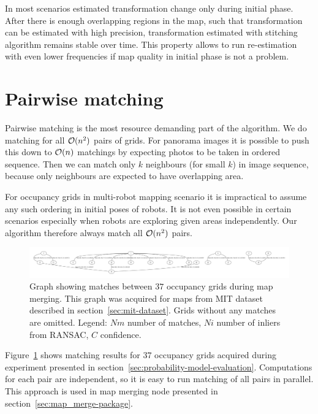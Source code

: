 In most scenarios estimated transformation change only during initial phase. After there is enough overlapping regions in the map, such that transformation can be estimated with high precision, transformation estimated with stitching algorithm remains stable over time. This property allows to run re-estimation with even lower frequencies if map quality in initial phase is not a problem.


\section{Pairwise matching} %
\label{sec:pairwisematching}

Pairwise matching is the most resource demanding part of the algorithm. We do matching for all $\operatorname{\mathcal{O}}(n^2)$ pairs of grids. For panorama images it is possible to push this down to $\operatorname{\mathcal{O}}(n)$ matchings by expecting photos to be taken in ordered sequence. Then we can match only $k$ neighbours (for small $k$) in image sequence, because only neighbours are expected to have overlapping area.

For occupancy grids in multi-robot mapping scenario it is impractical to assume any such ordering in initial poses of robots. It is not even possible in certain scenarios especially when robots are exploring given areas independently. Our algorithm therefore always match all $\operatorname{\mathcal{O}}(n^2)$ pairs.

\begin{figure}
    \centering
    \includegraphics[width=\textwidth]{../img/matches.pdf}
    \caption{Graph showing matches between $37$ occupancy grids during map merging. This graph was acquired for maps from MIT dataset described in section~\ref{sec:mit-dataset}. Grids without any matches are omitted. Legend: $Nm$ number of matches, $Ni$ number of inliers from \gls{RANSAC}, $C$ confidence.}
    \label{fig:matches}
\end{figure}

Figure~\ref{fig:matches} shows matching results for $37$ occupancy grids acquired during experiment presented in section~\ref{sec:probability-model-evaluation}. Computations for each pair are independent, so it is easy to run matching of all pairs in parallel. This approach is used in map merging node presented in section~\ref{sec:map_merge-package}.

